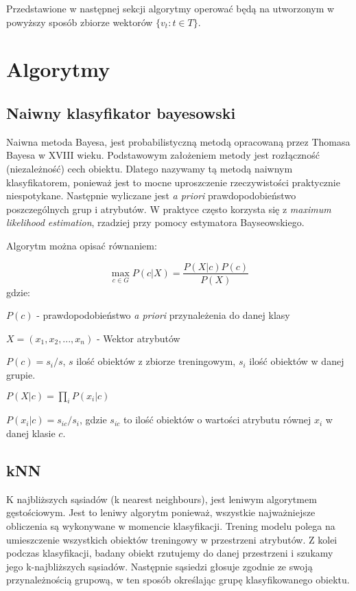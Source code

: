 \documentclass[a4paper,12pt]{article}
\begin{document}
	Przedstawione w następnej sekcji algorytmy operować będą
	na utworzonym w powyższy sposób zbiorze wektorów $\{v_t: t \in T\}$.

\section{Algorytmy}

\subsection{Naiwny klasyfikator bayesowski}
Naiwna metoda Bayesa, jest probabilistyczną metodą opracowaną przez Thomasa
Bayesa w XVIII wieku. Podstawowym założeniem metody jest rozłączność
(niezależność) cech obiektu. Dlatego nazywamy tą metodą naiwnym
klasyfikatorem, ponieważ jest to mocne uproszczenie rzeczywistości
praktycznie niespotykane. Następnie wyliczane jest \textit{a priori}
prawdopodobieństwo poszczególnych grup i atrybutów. W praktyce często
korzysta się z  \textit{maximum likelihood estimation}, rzadziej przy pomocy
estymatora Bayseowskiego.

Algorytm można opisać równaniem:

\[
\max_{c \in G} P(c | X) = \frac{P(X|c)P(c)}{P(X)}
\]
gdzie:

$P(c)$ - prawdopodobieństwo \textit{a priori} przynależenia do danej klasy

$X = (x_1,x_2,...,x_n)$ - Wektor atrybutów 

$P(c) = s_i / s$, $s$ ilość obiektów z zbiorze treningowym, $s_i$ ilość obiektów w danej grupie. 

$P(X|c) = \prod\limits_{i} P(x_i | c)$

$P(x_i | c) = s_{ic} / s_i$, gdzie $s_{ic}$ to ilość obiektów o wartości atrybutu równej $x_i$ w danej klasie $c$.


\subsection{kNN}
K najbliższych sąsiadów (k nearest neighbours), jest leniwym algorytmem
gęstościowym. Jest to leniwy algorytm ponieważ, wszystkie najważniejsze
obliczenia są wykonywane w momencie klasyfikacji. Trening modelu polega na
umieszczenie wszystkich obiektów treningowy w przestrzeni atrybutów. Z kolei
podczas klasyfikacji, badany obiekt rzutujemy do danej przestrzeni i szukamy
jego k-najbliższych sąsiadów. Następnie sąsiedzi głosuje zgodnie ze swoją
przynależnością grupową, w ten sposób określając grupę klasyfikowanego
obiektu. 
\end{document}
